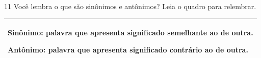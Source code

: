 
\num{11} Você lembra o que são sinônimos e antônimos? Leia o quadro para
relembrar.


\begin{longtable}[]{@{}l@{}}
\toprule
\begin{minipage}[t]{0.97\columnwidth}\raggedright\strut
\textbf{Sinônimo}: palavra que apresenta significado semelhante ao de
outra.

\textbf{Antônimo}: palavra que apresenta significado contrário ao de
outra.
\strut
\end{minipage}\tabularnewline
\bottomrule
\end{longtable}

